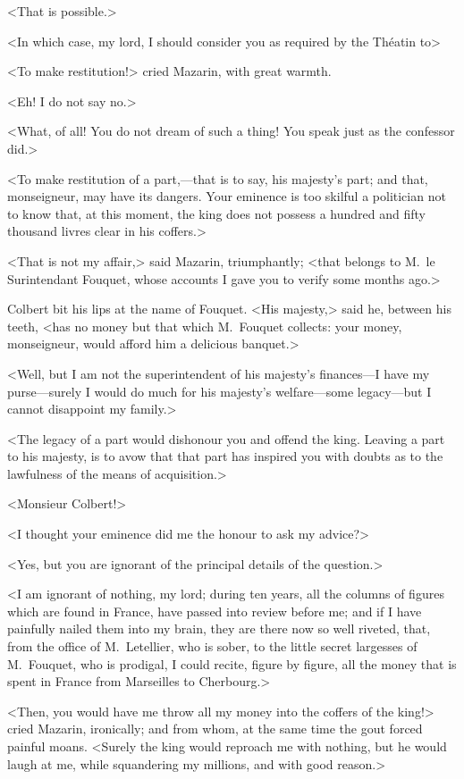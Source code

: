 <That is possible.>

<In which case, my lord, I should consider you as required by the Théatin to\longdash>

<To make restitution!> cried Mazarin, with great warmth.

<Eh! I do not say no.>

<What, of all! You do not dream of such a thing! You speak just as the confessor did.>

<To make restitution of a part,—that is to say, his majesty's part; and that, monseigneur, may have its dangers. Your eminence is too skilful a politician not to know that, at this moment, the king does not possess a hundred and fifty thousand livres clear in his coffers.>

<That is not my affair,> said Mazarin, triumphantly; <that belongs to M.~le Surintendant Fouquet, whose accounts I gave you to verify some months ago.>

Colbert bit his lips at the name of Fouquet. <His majesty,> said he, between his teeth, <has no money but that which M.~Fouquet collects: your money, monseigneur, would afford him a delicious banquet.>

<Well, but I am not the superintendent of his majesty's finances—I have my purse—surely I would do much for his majesty's welfare—some legacy—but I cannot disappoint my family.>

<The legacy of a part would dishonour you and offend the king. Leaving a part to his majesty, is to avow that that part has inspired you with doubts as to the lawfulness of the means of acquisition.>

<Monsieur Colbert!>

<I thought your eminence did me the honour to ask my advice?>

<Yes, but you are ignorant of the principal details of the question.>

<I am ignorant of nothing, my lord; during ten years, all the columns of figures which are found in France, have passed into review before me; and if I have painfully nailed them into my brain, they are there now so well riveted, that, from the office of M.~Letellier, who is sober, to the little secret largesses of M.~Fouquet, who is prodigal, I could recite, figure by figure, all the money that is spent in France from Marseilles to Cherbourg.>

<Then, you would have me throw all my money into the coffers of the king!> cried Mazarin, ironically; and from whom, at the same time the gout forced painful moans. <Surely the king would reproach me with nothing, but he would laugh at me, while squandering my millions, and with good reason.>

